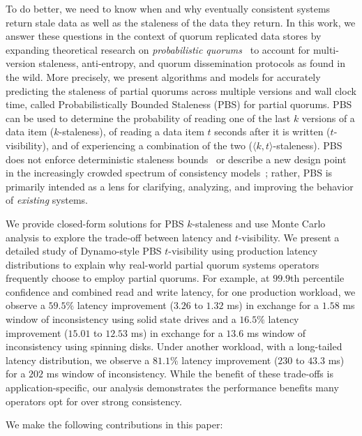 \documentclass{vldb}
\begin{document}
To do better, we need to know when and why eventually consistent
systems return stale data as well as the staleness of the data they
return.  In this work, we answer these questions in the context of
quorum replicated data stores by expanding theoretical research on
\textit{probabilistic quorums}~\cite{prob-quorum, quorum-overview} to
account for multi-version staleness, anti-entropy, and quorum
dissemination protocols as found in the wild.  More precisely, we
present algorithms and models for accurately predicting the staleness
of partial quorums across multiple versions and wall clock time,
called Probabilistically Bounded Staleness (PBS) for partial
quorums. PBS can be used to determine the probability of reading one
of the last $k$ versions of a data item ($k$-staleness), of reading a
data item $t$ seconds after it is written ($t$-visibility), and of
experiencing a combination of the two ($\langle k, t
\rangle$-staleness). PBS does not enforce deterministic staleness
bounds~\cite{ aqua, trapp,vahdat-article, vahdat-bounded, frac} or
describe a new design point in the increasingly crowded spectrum of
consistency models~\cite{cops, walter, sessionguarantees,
  vogels-defs}; rather, PBS is primarily intended as a lens for
clarifying, analyzing, and improving the behavior of \textit{existing}
systems.

We provide closed-form solutions for PBS $k$-staleness and use Monte
Carlo analysis to explore the trade-off between latency and
$t$-visibility.  We present a detailed study of Dynamo-style PBS
$t$-visibility using production latency distributions to explain why
real-world partial quorum systems operators frequently choose to
employ partial quorums. For example, at $99.9$th percentile confidence
and combined read and write latency, for one production workload, we
observe a $59.5\%$ latency improvement ($3.26$ to $1.32$ ms) in
exchange for a $1.58$ ms window of inconsistency using solid state
drives and a $16.5\%$ latency improvement ($15.01$ to $12.53$ ms) in
exchange for a $13.6$ ms window of inconsistency using spinning disks.
Under another workload, with a long-tailed latency distribution, we
observe a $81.1\%$ latency improvement ($230$ to $43.3$ ms) for a
$202$ ms window of inconsistency.  While the benefit of these
trade-offs is application-specific, our analysis demonstrates the
performance benefits many operators opt for over strong consistency.

We make the following contributions in this paper:
\end{document}
